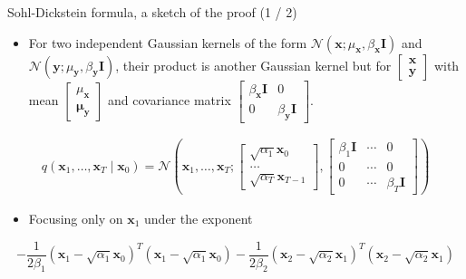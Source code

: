 \documentclass{beamer}
\begin{document}
\begin{frame}{Sohl-Dickstein formula, a sketch of the proof (1 / 2)}
\begin{itemize}
  \item For two independent Gaussian kernels of the form $\mathcal{N}(\mathbf{x};\mu_{\mathbf{x}}, \beta_{\mathbf{x}}\mathbf{I})$ and $\mathcal{N}(\mathbf{y};\mu_{\mathbf{y}}, \beta_{\mathbf{y}} \mathbf{I})$, their product is another Gaussian kernel but for $\begin{bmatrix}\mathbf{x}\\ \mathbf{y}\end{bmatrix}$ with mean $\begin{bmatrix}\mu_{\mathbf{x}} \\ \mathbf{\mu}_{\mathbf{y}}\end{bmatrix}$ and covariance matrix $\begin{bmatrix}\beta_{\mathbf{x}}\mathbf{I} & 0 \\ 0 & \beta_{\mathbf{y}}\mathbf{I}\end{bmatrix}$. 
\end{itemize}
\begin{align*}
  q(\mathbf{x}_{1},\dots,\mathbf{x}_{T} \mid \mathbf{x}_{0})=\mathcal{N}\left(\mathbf{x}_{1},\dots,\mathbf{x}_{T};\begin{bmatrix}
\sqrt{\alpha_{1}}\mathbf{x}_{0} \\
\dots \\
\sqrt{\alpha_{T}}\mathbf{x}_{T-1}
\end{bmatrix}, \begin{bmatrix}
\beta_{1}\mathbf{I} & \cdots & 0 \\
0 & \cdots & 0 \\ 
0 & \cdots & \beta_{T}\mathbf{I}
\end{bmatrix}\right)
\end{align*}
\begin{itemize}
  \item Focusing only on $\mathbf{x}_1$ under the exponent
\end{itemize}
$$
 -\frac{1}{2\beta_{1}}(\mathbf{x}_{1}-\sqrt{ \alpha_{1} }\mathbf{x}_{0})^T(\mathbf{x}_{1}-\sqrt{ \alpha_{1} }\mathbf{x}_{0}) -\frac{1}{2\beta_{2}}(\mathbf{x}_{2}-\sqrt{ \alpha_{2} }\mathbf{x}_{1})^T(\mathbf{x}_{2}-\sqrt{ \alpha_{2} }\mathbf{x}_{1})
$$
\end{frame}
\end{document}
